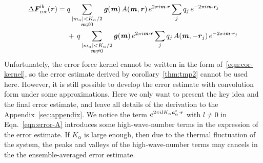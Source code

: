 \documentclass[aps,pre,preprint,unsortedaddress]{revtex4}
\renewcommand{\v}[1]{\textbf{\textit{#1}}}
\begin{document}
\begin{align}\nonumber
  \Delta\v F_{\textrm{rec}}^{\textrm{ik}}(\v r)
  =\;&
  q
  \sum_{
    \begin{subarray}{c}
      \vert m_{\alpha}\vert < K_\alpha/2\\
      \v m\neq 0
    \end{subarray}}
  \v g(\v m)\,
  A(\v m, \v r)\,
  e^{2\pi i\v m\cdot \v r}
  \sum_{j}q_j\,e^{-2\pi i\v m\cdot\v r_j} \\\label{eqn:ik.error.force}
  & +\,
  q
  \sum_{
    \begin{subarray}{c}
      \vert m_{\alpha}\vert < K_\alpha/2\\
      \v m\neq 0
    \end{subarray}}
  \v g(\v m)\,
  e^{2\pi i\v m\cdot \v r}
  \sum_{j}q_j\,A(\v m, -\v r_j)\,e^{-2\pi i\v m\cdot\v r_j}
\end{align}
Unfortunately, the
error force kernel
cannot be written
in the form of~\eqref{eqn:cor-kernel}, so the error estimate derived by
corollary~\ref{thm:tmp2} cannot be used here. However, it is still
possible to develop the error estimate with convolution form under
some approximations.
Here we only want to present the key idea and the final  error
estimate, and leave all details of the derivation 
to the Appendix~\ref{sec:appendix}.  We notice the
term $e^{2\pi i l K_\alpha\v a^\ast_\alpha\cdot\v r}$ with $l\neq 0$
in Eqn.~\eqref{eqn:error-A} introduces some high-wave-number terms in
the expression of the error estimate.  If $K_\alpha$ is large enough,
then due to the thermal fluctuation of the system, the peaks and
valleys of the high-wave-number terms may cancels in the the
ensemble-averaged error estimate.
\end{document}
